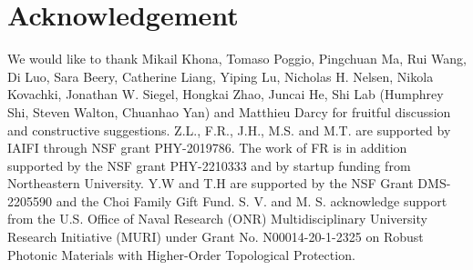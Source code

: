 \documentclass{article}
\numberwithin{equation}{section}
\numberwithin{figure}{section}
\begin{document}

\section*{Acknowledgement}
We would like to thank Mikail Khona, Tomaso Poggio, Pingchuan Ma, Rui Wang, Di Luo, Sara Beery, Catherine Liang, Yiping Lu, Nicholas H. Nelsen, Nikola Kovachki, Jonathan W. Siegel, Hongkai Zhao, Juncai He, Shi Lab (Humphrey Shi, Steven Walton, Chuanhao Yan) and Matthieu Darcy for fruitful discussion and constructive suggestions. Z.L., F.R., J.H., M.S. and M.T. are supported by IAIFI through NSF grant PHY-2019786. The work of FR is in addition supported by the NSF grant PHY-2210333 and by startup funding from Northeastern University. Y.W and T.H are supported by the NSF Grant DMS-2205590 and the Choi Family Gift Fund. S. V. and M. S. acknowledge support from the U.S. Office of Naval Research (ONR) Multidisciplinary University Research Initiative (MURI) under Grant No. N00014-20-1-2325 on Robust Photonic Materials with Higher-Order Topological Protection.




\newpage
\end{document}
